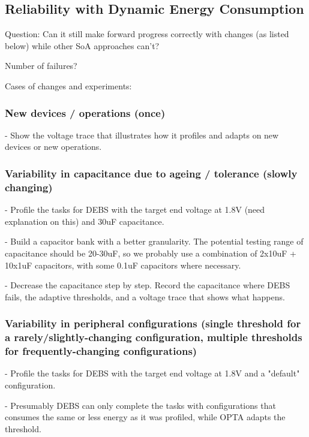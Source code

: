 



\subsection{Reliability with Dynamic Energy Consumption}

Question: Can it still make forward progress correctly with changes (as listed below) while other SoA approaches can't? 

Number of failures?

Cases of changes and experiments:

\subsubsection{New devices / operations (once)}

- Show the voltage trace that illustrates how it profiles and adapts on new devices or new operations. 

\subsubsection{Variability in capacitance due to ageing / tolerance (slowly changing)}

- Profile the tasks for DEBS with the target end voltage at 1.8V (need explanation on this) and 30uF capacitance. 

- Build a capacitor bank with a better granularity. The potential testing range of capacitance should be 20-30uF, so we probably use a combination of 2x10uF + 10x1uF capacitors, with some 0.1uF capacitors where necessary. 

- Decrease the capacitance step by step. Record the capacitance where DEBS fails, the adaptive thresholds, and a voltage trace that shows what happens. 

\subsubsection{Variability in peripheral configurations (single threshold for a rarely/slightly-changing configuration, multiple thresholds for frequently-changing configurations)}

- Profile the tasks for DEBS with the target end voltage at 1.8V and a "default" configuration. 
    
- Presumably DEBS can only complete the tasks with configurations that consumes the same or less energy as it was profiled, while OPTA adapts the threshold. 

